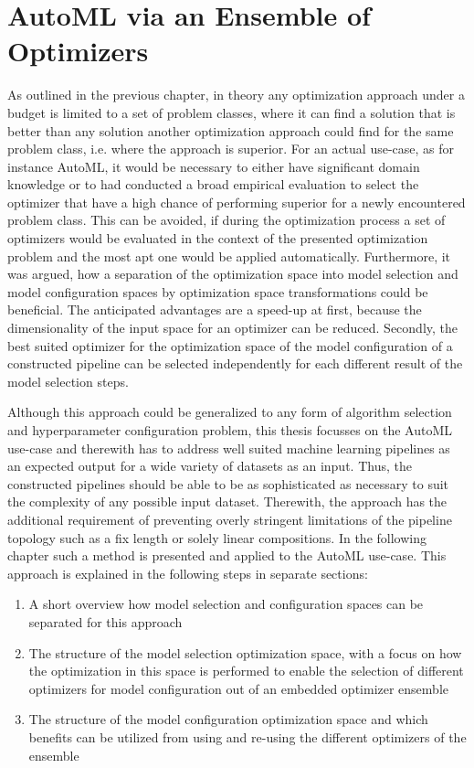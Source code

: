 %
\chapter{AutoML via an Ensemble of Optimizers}
\label{sec:approach}
As outlined in the previous chapter, in theory any optimization approach under a budget is limited to a set of problem classes, where it can find a solution that is better than any solution another optimization approach could find for the same problem class, i.e. where the approach is superior.
For an actual use-case, as for instance AutoML, it would be necessary to either have significant domain knowledge or to had conducted a broad empirical evaluation to select the optimizer that have a high chance of performing superior for a newly encountered problem class.
This can be avoided, if during the optimization process a set of optimizers would be evaluated in the context of the presented optimization problem and the most apt one would be applied automatically.\newline
Furthermore, it was argued, how a separation of the optimization space into model selection and model configuration spaces by optimization space transformations could be beneficial.
The anticipated advantages are a speed-up at first, because the dimensionality of the input space for an optimizer can be reduced.
Secondly, the best suited optimizer for the optimization space of the model configuration of a constructed pipeline can be selected independently for each different result of the model selection steps.

Although this approach could be generalized to any form of algorithm selection and hyperparameter configuration problem, this thesis focusses on the AutoML use-case and therewith has to address well suited machine learning pipelines as an expected output for a wide variety of datasets as an input.
Thus, the constructed pipelines should be able to be as sophisticated as necessary to suit the complexity of any possible input dataset.
Therewith, the approach has the additional requirement of preventing overly stringent limitations of the pipeline topology such as a fix length or solely linear compositions.\newline
In the following chapter such a method is presented and applied to the AutoML use-case.
This approach is explained in the following steps in separate sections:
\begin{enumerate}
    \item A short overview how model selection and configuration spaces can be separated for this approach
    \item The structure of the model selection optimization space, with a focus on how the optimization in this space is performed to enable the selection of different optimizers for model configuration out of an embedded optimizer ensemble
    \item The structure of the model configuration optimization space and which benefits can be utilized from using and re-using the different optimizers of the ensemble
\end{enumerate}

